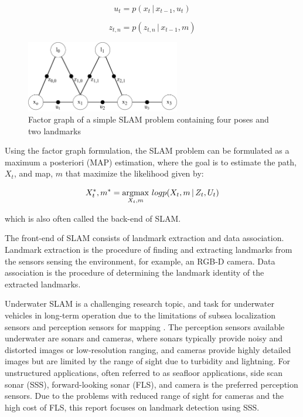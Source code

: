 \begin{equation}
    u_t = p(x_t \,|\, x_{t-1},u_t)
    \label{eq:odom_pdf}
\end{equation}

\begin{equation}
    z_{t,n} = p(z_{t,n} \,|\, x_{t-1},m)
    \label{eq:landmark_measurement_pdf}
\end{equation}

\begin{figure}
    \centering
    \includegraphics[width=0.6\textwidth]{figures/factor_graph.drawio.pdf}
    \caption{Factor graph of a simple SLAM problem containing four poses and two landmarks}
    \label{fig:factor_graph}
\end{figure}

Using the factor graph formulation, the SLAM problem can be formulated as a maximum a posteriori (MAP) estimation, where the goal is to estimate the path, $X_t$, and map, $m$ that maximize the likelihood given by:

\begin{equation}
    X_t^*, m^* = \operatorname*{argmax}_{X_t,m} \, logp(X_t,m \,|\, Z_t,U_t)
    \label{eq:SLAM}
\end{equation}

which is also often called the back-end of SLAM.

The front-end of SLAM consists of landmark extraction and data association. Landmark extraction is the procedure of finding and extracting landmarks from the sensors sensing the environment, for example, an RGB-D camera.  Data association is the procedure of determining the landmark identity of the extracted landmarks.

Underwater SLAM is a challenging research topic, and task for underwater vehicles in long-term operation due to the limitations of subsea localization sensors and perception sensors for mapping \cite{Hidalgo2015ReviewTechniques}. The perception sensors available underwater are sonars and cameras, where sonars typically provide noisy and distorted images or low-resolution ranging, and cameras provide highly detailed images but are limited by the range of sight due to turbidity and lightning. For unstructured applications, often referred to as seafloor applications, side scan sonar (SSS), forward-looking sonar (FLS), and camera is the preferred perception sensors. Due to the problems with reduced range of sight for cameras and the high cost of FLS, this report focuses on landmark detection using SSS.

